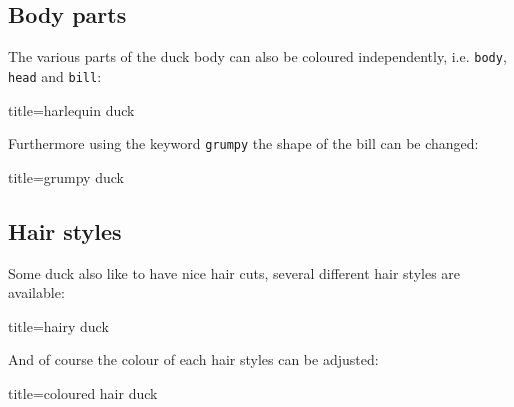 \documentclass{ltxdockit}
\begin{document}
\subsection{Body parts}

The various parts of the duck body can also be coloured independently, i.e. \texttt{body}, \texttt{head} and \texttt{bill}:
\begin{tcblisting}{title={harlequin duck}}
\begin{tikzpicture}
	\duck[body=yellow,
		head=yellow!50!orange, 
		bill=red]
\end{tikzpicture}
\end{tcblisting}

Furthermore using the keyword \texttt{grumpy} the shape of the bill can be changed:
\begin{tcblisting}{title={grumpy duck}}
\begin{tikzpicture}
	\duck[grumpy]
\end{tikzpicture}
\end{tcblisting}

\subsection{Hair styles}

Some duck also like to have nice hair cuts, several different hair styles are available:
\begin{tcblisting}{title={hairy duck}}
\begin{tikzpicture}
	\duck[longhair]
\end{tikzpicture}
\begin{tikzpicture}
	\duck[shorthair]
\end{tikzpicture}

\begin{tikzpicture}
	\duck[crazyhair]
\end{tikzpicture}
\begin{tikzpicture}
	\duck[recedinghair]
\end{tikzpicture}
\end{tcblisting}

And of course the colour of each hair styles can be adjusted:
\begin{tcblisting}{title={coloured hair duck}}
\begin{tikzpicture}
	\duck[longhair=teal]
\end{tikzpicture}
\end{tcblisting}
\end{document}
